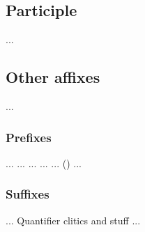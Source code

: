 

\subsection{Participle}
...


\subsection{Other affixes}

...

\subsubsection{Prefixes}
...  ...
...  ...
...  (\Refl{}) ...

\subsubsection{Suffixes}
... Quantifier clitics and stuff ...

